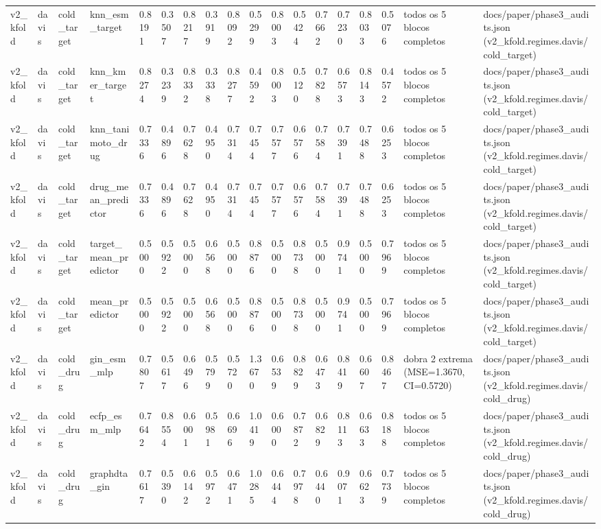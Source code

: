 \begin{table}[htbp]
\begin{tabular}{llllllllllllllllll}
v2\_kfold & davis & cold\_target & knn\_esm\_target & 0.8191 & 0.3507 & 0.8217 & 0.3919 & 0.8092 & 0.5299 & 0.8003 & 0.5424 & 0.7662 & 0.7230 & 0.8033 & 0.5076 & todos os 5 blocos completos & docs/paper/phase3\_audits.json (v2\_kfold.regimes.davis/cold\_target) \\
v2\_kfold & davis & cold\_target & knn\_kmer\_target & 0.8274 & 0.3239 & 0.8332 & 0.3338 & 0.8277 & 0.4592 & 0.8003 & 0.5120 & 0.7828 & 0.6573 & 0.8143 & 0.4572 & todos os 5 blocos completos & docs/paper/phase3\_audits.json (v2\_kfold.regimes.davis/cold\_target) \\
v2\_kfold & davis & cold\_target & knn\_tanimoto\_drug & 0.7336 & 0.4896 & 0.7628 & 0.4950 & 0.7314 & 0.7454 & 0.7577 & 0.6576 & 0.7584 & 0.7391 & 0.7488 & 0.6253 & todos os 5 blocos completos & docs/paper/phase3\_audits.json (v2\_kfold.regimes.davis/cold\_target) \\
v2\_kfold & davis & cold\_target & drug\_mean\_predictor & 0.7336 & 0.4896 & 0.7628 & 0.4950 & 0.7314 & 0.7454 & 0.7577 & 0.6576 & 0.7584 & 0.7391 & 0.7488 & 0.6253 & todos os 5 blocos completos & docs/paper/phase3\_audits.json (v2\_kfold.regimes.davis/cold\_target) \\
v2\_kfold & davis & cold\_target & target\_mean\_predictor & 0.5000 & 0.5922 & 0.5000 & 0.6568 & 0.5000 & 0.8876 & 0.5000 & 0.8738 & 0.5000 & 0.9741 & 0.5000 & 0.7969 & todos os 5 blocos completos & docs/paper/phase3\_audits.json (v2\_kfold.regimes.davis/cold\_target) \\
v2\_kfold & davis & cold\_target & mean\_predictor & 0.5000 & 0.5922 & 0.5000 & 0.6568 & 0.5000 & 0.8876 & 0.5000 & 0.8738 & 0.5000 & 0.9741 & 0.5000 & 0.7969 & todos os 5 blocos completos & docs/paper/phase3\_audits.json (v2\_kfold.regimes.davis/cold\_target) \\
v2\_kfold & davis & cold\_drug & gin\_esm\_mlp & 0.7807 & 0.5617 & 0.6496 & 0.5799 & 0.5720 & 1.3670 & 0.6539 & 0.8829 & 0.6473 & 0.8419 & 0.6607 & 0.8467 & dobra 2 extrema (MSE=1.3670, CI=0.5720) & docs/paper/phase3\_audits.json (v2\_kfold.regimes.davis/cold\_drug) \\
v2\_kfold & davis & cold\_drug & ecfp\_esm\_mlp & 0.7642 & 0.8554 & 0.6001 & 0.5981 & 0.6696 & 1.0419 & 0.6000 & 0.7872 & 0.6829 & 0.8113 & 0.6633 & 0.8188 & todos os 5 blocos completos & docs/paper/phase3\_audits.json (v2\_kfold.regimes.davis/cold\_drug) \\
v2\_kfold & davis & cold\_drug & graphdta\_gin & 0.7617 & 0.5390 & 0.6142 & 0.5972 & 0.6471 & 1.0285 & 0.6444 & 0.7978 & 0.6440 & 0.9071 & 0.6623 & 0.7739 & todos os 5 blocos completos & docs/paper/phase3\_audits.json (v2\_kfold.regimes.davis/cold\_drug) \\

\end{tabular}
\end{table}
